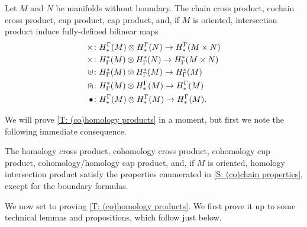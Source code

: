 \begin{theorem}\label{T: (co)homology products}
	Let $M$ and $N$ be manifolds without boundary.
	The chain cross product, cochain cross product, cup product, cap product, and, if $M$ is oriented, intersection product induce fully-defined bilinear maps
	\begin{align*}
		\times \colon & H^\Gamma_*(M) \otimes H^\Gamma_*(N) \to H^\Gamma_*(M \times N)\\
		\times \colon & H_\Gamma^*(M) \otimes H_\Gamma^*(N) \to H_\Gamma^*(M \times N)\\
		\uplus \colon & H_\Gamma^*(M) \otimes H_\Gamma^*(M) \to H_\Gamma^*(M)\\
		\nplus \colon & H_\Gamma^*(M) \otimes H^\Gamma_*(M) \to H^\Gamma_*(M)\\
		\bullet \colon & H^\Gamma_*(M) \otimes H^\Gamma_*(M) \to H^\Gamma_*(M).\\
	\end{align*}
\end{theorem}

We will prove \cref{T: (co)homology products} in a moment, but first we note the following immediate consequence.

\begin{theorem}
	The homology cross product, cohomology cross product, cohomology cup product, cohomology/homology cap product, and, if $M$ is oriented, homology intersection product satisfy the properties enumerated in \cref{S: (co)chain properties}, except for the boundary formulas.
\end{theorem}

We now set to proving \cref{T: (co)homology products}.
We first prove it up to some technical lemmas and propositions, which follow just below.

\begin{comment}
Suppose V is a cycle transverse to N that bounds. Then there is a Z transverse to N that realizes it:

Choose Y so that \bd Y \sqcup  -V \in Q. Y may not be transverse.

Do a universal homotopy on Y \sqcup V so that Y becomes transverse and the trace of V is transverse. Let Y’ and V’ be the results and let W be the trace of the V homotopy. Let Z = Y’ \sqcup -W, which is transverse. Also \bd Y’ \sqcup -V’ is in Q.

Then \bd Z \sqcup -V is
(\bd Y’ \sqcup - V’ \sqcup V \sqcup -V)
Which is in Q.

\end{comment}



